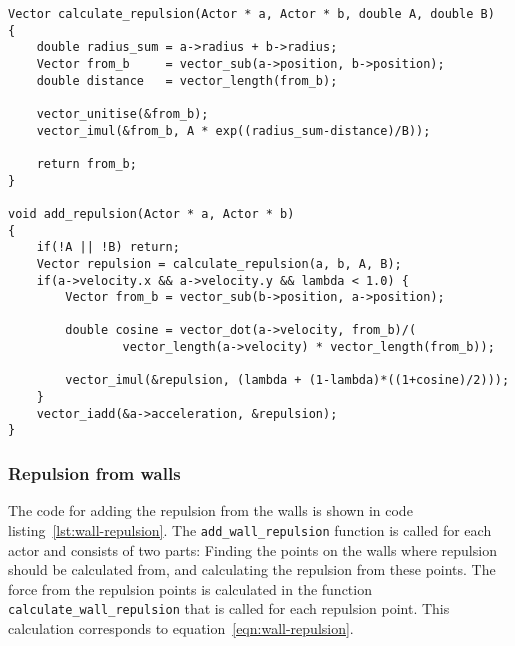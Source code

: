 \begin{lstlisting}[caption={Calculating the repulsion from other 
    agents.},label=lst:actor-repulsion]
Vector calculate_repulsion(Actor * a, Actor * b, double A, double B)
{
    double radius_sum = a->radius + b->radius;
    Vector from_b     = vector_sub(a->position, b->position);
    double distance   = vector_length(from_b);

    vector_unitise(&from_b);
    vector_imul(&from_b, A * exp((radius_sum-distance)/B));

    return from_b;
}

void add_repulsion(Actor * a, Actor * b)
{
    if(!A || !B) return;
    Vector repulsion = calculate_repulsion(a, b, A, B);
	if(a->velocity.x && a->velocity.y && lambda < 1.0) {
		Vector from_b = vector_sub(b->position, a->position);

		double cosine = vector_dot(a->velocity, from_b)/(
				vector_length(a->velocity) * vector_length(from_b));

		vector_imul(&repulsion, (lambda + (1-lambda)*((1+cosine)/2)));
	}
    vector_iadd(&a->acceleration, &repulsion);
}
\end{lstlisting}

\subsubsection{Repulsion from walls}
The code for adding the repulsion from the walls is shown in code 
listing~\ref{lst:wall-repulsion}. The \texttt{add\_wall\_repulsion} function 
is called for each actor and consists of two parts: Finding the points on the 
walls where repulsion should be calculated from, and calculating the repulsion 
from these points. The force from the repulsion points is calculated in the 
function \texttt{calculate\_wall\_repulsion} that is called for each repulsion 
point. This calculation corresponds to equation~\eqref{eqn:wall-repulsion}.


